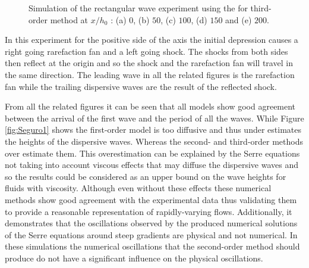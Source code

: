 \documentclass[SingleSpace,12pt,Proceedings]{Serre_ASCE}
\begin{document}
\begin{figure}
\caption{Simulation of the rectangular wave experiment using the for third-order method at $x/h_0$ : (a) $0$, (b) $50$, (c) $100$, (d) $150$ and (e) $200$.}
\label{fig:Seguro3}
\end{figure}

In this experiment for the positive side of the axis the initial depression causes a right going rarefaction fan and a left going shock. The shocks from both sides then reflect at the origin and so the shock and the rarefaction fan will travel in the same direction. The leading wave in all the related figures is the rarefaction fan while the trailing dispersive waves are the result of the reflected shock.  

From all the related figures it can be seen that all models show good agreement between the arrival of the first wave and the period of all the waves. While Figure \ref{fig:Seguro1} shows the first-order model is too diffusive and thus under estimates the heights of the dispersive waves. Whereas the second- and third-order methods over estimate them. This overestimation can be explained by the Serre equations not taking into account viscous effects that may diffuse the dispersive waves and so the results could be considered as an upper bound on the wave heights for fluids with viscosity. Although even without these effects these numerical methods show good agreement with the experimental data thus validating them to provide a reasonable representation of rapidly-varying flows. Additionally, it demonstrates that the oscillations observed by the produced numerical solutions of the Serre equations around steep gradients are physical and not numerical. In these simulations the numerical oscillations that the second-order method should produce \cite{Zoppou-Roberts-1996} do not have a significant influence on the physical oscillations. 
\end{document}

